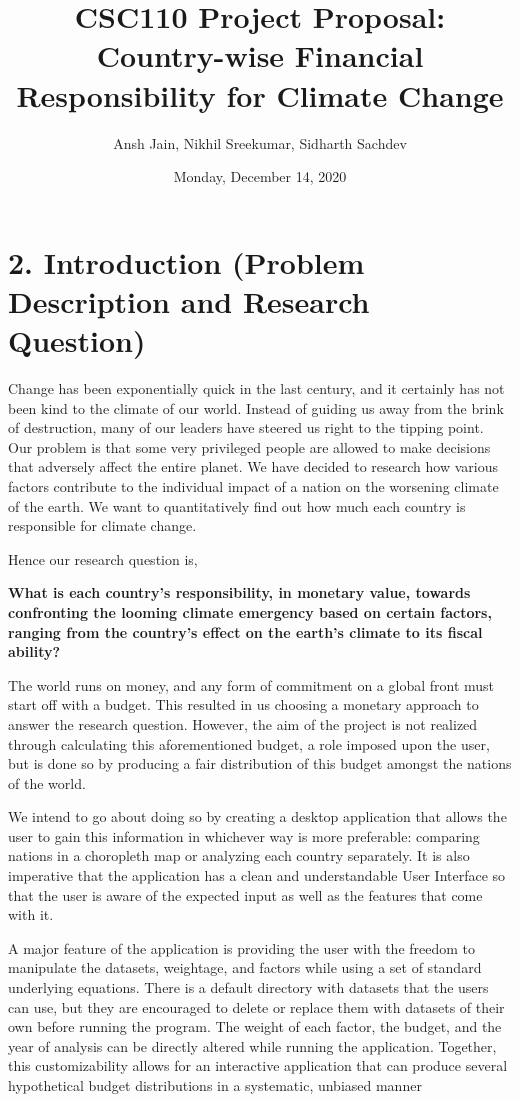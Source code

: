 \documentclass[fontsize=11pt]{article}
\title{CSC110 Project Proposal: Country-wise Financial Responsibility for Climate Change}
\author{Ansh Jain, Nikhil Sreekumar, Sidharth Sachdev}
\date{Monday, December 14, 2020}
\begin{document}
    \maketitle

    \section*{2. Introduction (Problem Description and Research Question)}

    Change has been exponentially quick in the last century, and it certainly has not been kind to the climate of our world. Instead of guiding us away from the brink of destruction, many of our leaders have steered us right to the tipping point. Our problem is that some very privileged people are allowed to make decisions that adversely affect the entire planet. We have decided to research how various factors contribute to the individual impact of a nation on the worsening climate of the earth. We want to quantitatively find out how much each country is responsible for climate change.\newline

    Hence our research question is,

    \textbf{What is each country’s responsibility, in monetary value, towards confronting the looming climate emergency based on certain factors, ranging from the country’s effect on the earth’s climate to its fiscal ability?}\newline

    The world runs on money, and any form of commitment on a global front must start off with a budget. This resulted in us choosing a monetary approach to answer the research question. However, the aim of the project is not realized through calculating this aforementioned budget, a role imposed upon the user, but is done so by producing a fair distribution of this budget amongst the nations of the world.\newline

    We intend to go about doing so by creating a desktop application that allows the user to gain this information in whichever way is more preferable: comparing nations in a choropleth map or analyzing each country separately. It is also imperative that the application has a clean and understandable User Interface so that the user is aware of the expected input as well as the features that come with it.\newline


    A major feature of the application is providing the user with the freedom to manipulate the datasets, weightage, and factors while using a set of standard underlying equations. There is a default directory with datasets that the users can use, but they are encouraged to delete or replace them with datasets of their own before running the program. The weight of each factor, the budget, and the year of analysis can be directly altered while running the application. Together, this customizability allows for an interactive application that can produce several hypothetical budget distributions in a systematic, unbiased manner
\end{document}
